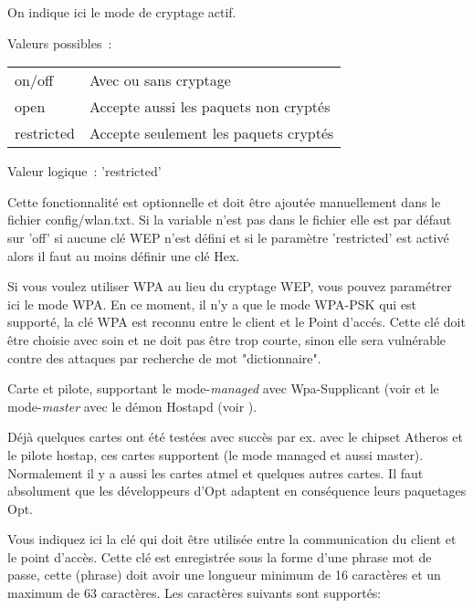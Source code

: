 \begin{description}

      On indique ici le mode de cryptage actif.

      Valeurs possibles~:

        \begin{tabular}[h]{ll}
          on/off &         Avec ou sans cryptage \\
          open   &         Accepte aussi les paquets non cryptés \\
          restricted &     Accepte seulement les paquets cryptés \\
        \end{tabular}

      Valeur logique~: 'restricted'

      Cette fonctionnalité est optionnelle et doit être ajoutée manuellement
      dans le fichier config/wlan.txt. Si la variable n'est pas dans le fichier
      elle est par défaut sur 'off' si aucune clé WEP n'est défini et si le
      paramètre 'restricted' est activé alors il faut au moins définir une clé Hex.


      Si vous voulez utiliser WPA au lieu du cryptage WEP, vous pouvez paramétrer
      ici le mode WPA. En ce moment, il n'y a que le mode WPA-PSK qui est
      supporté, la clé WPA est reconnu entre le client et le Point d'accés. Cette
      clé doit être choisie avec soin et ne doit pas être trop courte, sinon elle
      sera vulnérable contre des attaques par recherche de mot "dictionnaire".

      Carte et pilote, supportant le mode-\emph{managed} avec Wpa-Supplicant
      (voir  et le mode-\emph{master}
      avec le démon Hostapd (voir ).

      Déjà quelques cartes ont été testées avec succès par ex. avec le chipset
      Atheros et le pilote hostap, ces cartes supportent (le mode managed et
      aussi master). Normalement il y a aussi les cartes atmel et quelques
      autres cartes. Il faut absolument que les développeurs d'Opt adaptent
      en conséquence leurs paquetages Opt.


      Vous indiquez ici la clé qui doit être utilisée entre la communication du
      client et le point d'accès. Cette clé est enregistrée sous la forme d'une
      phrase mot de passe, cette (phrase) doit avoir une longueur minimum de 16
      caractères et un maximum de 63 caractères.
      Les caractères suivants sont supportés:


\end{description}
